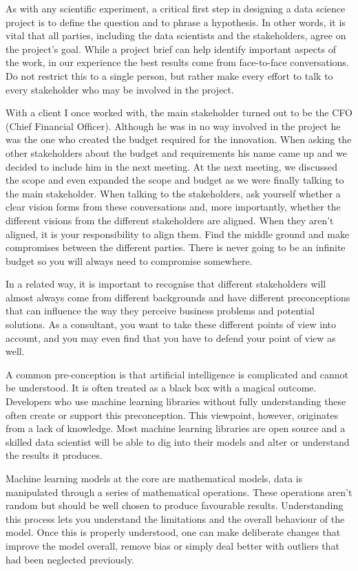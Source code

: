 \documentclass[
]{book}
\begin{document}
As with any scientific experiment, a critical first step in designing a data science project is to define the question and to phrase a hypothesis. In other words, it is vital that all parties, including the data scientists and the stakeholders, agree on the project's goal. While a project brief can help identify important aspects of the work, in our experience the best results come from face-to-face conversations. Do not restrict this to a single person, but rather make every effort to talk to every stakeholder who may be involved in the project.

With a client I once worked with, the main stakeholder turned out to be the CFO (Chief Financial Officer). Although he was in no way involved in the project he was the one who created the budget required for the innovation. When asking the other stakeholders about the budget and requirements his name came up and we decided to include him in the next meeting. At the next meeting, we discussed the scope and even expanded the scope and budget as we were finally talking to the main stakeholder. When talking to the stakeholders, ask yourself whether a clear vision forms from these conversations and, more importantly, whether the different visions from the different stakeholders are aligned. When they aren't aligned, it is your responsibility to align them. Find the middle ground and make compromises between the different parties. There is never going to be an infinite budget so you will always need to compromise somewhere.

In a related way, it is important to recognise that different stakeholders will almost always come from different backgrounds and have different preconceptions that can influence the way they perceive business problems and potential solutions. As a consultant, you want to take these different points of view into account, and you may even find that you have to defend your point of view as well.

A common pre-conception is that artificial intelligence is complicated and cannot be understood. It is often treated as a black box with a magical outcome. Developers who use machine learning libraries without fully understanding these often create or support this preconception. This viewpoint, however, originates from a lack of knowledge. Most machine learning libraries are open source and a skilled data scientist will be able to dig into their models and alter or understand the results it produces.

Machine learning models at the core are mathematical models, data is manipulated through a series of mathematical operations. These operations aren't random but should be well chosen to produce favourable results. Understanding this process lets you understand the limitations and the overall behaviour of the model. Once this is properly understood, one can make deliberate changes that improve the model overall, remove bias or simply deal better with outliers that had been neglected previously.
\end{document}
